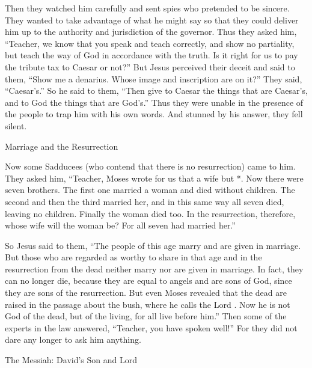 {\par }{\PP {}Then
they watched
him carefully
and sent
spies
who pretended
to be sincere.
They wanted to take advantage
of what he might say
so that
they could deliver
him
up
to the authority
and
jurisdiction
of the governor.
Thus
they asked
him,
“Teacher,
we know
that
you speak
and
teach
correctly,
and
show
no
partiality,
but
teach
the way
of God
in accordance with
the truth.
Is it right
for us
to pay
the tribute tax
to Caesar
or
not?”
But
Jesus perceived
their
deceit
and said
to
them,
“Show
me
a denarius.
Whose
image
and
inscription
are on it?” They said,
“Caesar’s.”
So
he said
to
them,
“Then
give
to Caesar
the things that are Caesar’s,
and
to God
the things that are God’s.”
Thus
they were unable
in the presence
of the people
to trap
him with his own words.
And
stunned
by
his
answer,
they fell silent.
\par }{\SH Marriage and the Resurrection
\par }{\PP {}Now
some
Sadducees
(who contend
that there is
no
resurrection) came
to him.
They asked
him, “Teacher,
Moses
wrote
for us
that
{}
a wife
but
{}*.
Now there were
seven
brothers.
The first one
married
a woman
and died
without children.
The second
and
then the third
married
her,
and
in this same way
all seven
died,
leaving
no
children.
Finally
the woman
died
too.
In
the resurrection,
therefore,
whose
wife
will
the woman
be? For
all seven
had
married
her.”
\par }{\PP {}So
Jesus
said
to them,
“The people
of this
age
marry
and
are given in marriage.
But
those who are regarded as worthy
to share
in that
age
and
in the resurrection
from
the dead
neither
marry
nor
are given in marriage.
In fact, they can
no
longer
die,
because
they are
equal to angels
and
are
sons
of God,
since they are
sons
of the resurrection.
But
even
Moses
revealed
that the dead
are raised
in the passage about
the bush,
where
he calls
the Lord
{}.
Now he is
not
God
of
the dead,
but
of
the living,
for
all
live
before him.”
Then
some
of the experts in the law
answered,
“Teacher,
you have spoken
well!”
For
they did
not
dare
any longer
to ask
him
anything.
\par }{\SH The Messiah: David’s Son and Lord
}
